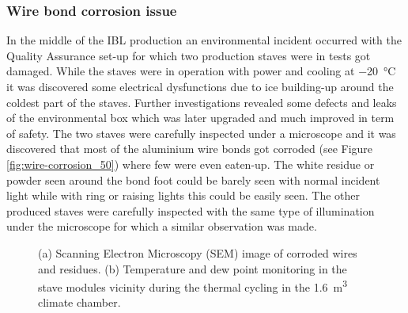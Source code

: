 \subsubsection{Wire bond corrosion issue}
In the middle of the IBL production an environmental incident occurred with the Quality Assurance set-up for which two production staves were in tests got damaged. While the staves were in operation with power and cooling at \SI{-20}{\celsius} it was discovered some electrical dysfunctions due to ice building-up around the coldest part of the staves. Further investigations revealed some defects and leaks of the environmental box which was later upgraded and much improved in term of safety.
The two staves were carefully inspected under a microscope and it was discovered that most of the aluminium wire bonds got corroded (see Figure\,\ref{fig:wire-corrosion_50}) where few were even eaten-up. The white residue or powder seen around the bond foot could be barely seen with normal incident light while with ring or raising lights this could be easily seen.
The other produced staves were carefully inspected with the same type of illumination under the microscope for which a similar observation was made.
 \begin{figure}
        \centering
        \caption{(a) Scanning Electron Microscopy (SEM) image of corroded wires and residues. (b) Temperature and dew point monitoring in the stave modules vicinity during the thermal cycling in the \SI{1.6}{\meter\cubed} climate chamber.}
        \label{fig:wire-corrosion}
\end{figure}
